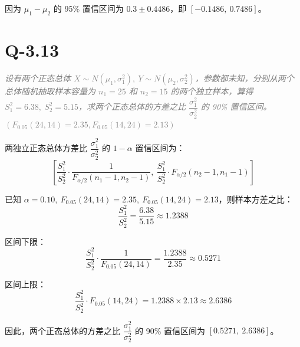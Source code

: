 \documentclass{article}
\begin{document}
因为 $\mu_1-\mu_2$ 的 95\% 置信区间为 $0.3\pm0.4486$，即 $[-0.1486,\ 0.7486]$。



\section{Q-3.13}
\textit{\textcolor{gray}{设有两个正态总体 $X\sim N(\mu_1, \sigma_1^2),\ Y\sim N(\mu_2, \sigma_2^2)$，参数都未知，分别从两个总体随机抽取样本容量为 $n_1=25$ 和 $n_2=15$ 的两个独立样本，算得 $S_1^2=6.38,\ S_2^2=5.15$，求两个正态总体的方差之比 $\dfrac{\sigma_1^2}{\sigma_2^2}$ 的 90\% 置信区间。$(F_{0.05}(24,14) = 2.35, F_{0.05}(14,24) = 2.13)$}}

两独立正态总体方差比 $\dfrac{\sigma_1^2}{\sigma_2^2}$ 的 $1-\alpha$ 置信区间为：
\[ \left[\dfrac{S_1^2}{S_2^2}\cdot\dfrac{1}{F_{\alpha/2}(n_1-1,n_2-1)},\ \dfrac{S_1^2}{S_2^2}\cdot F_{\alpha/2}(n_2-1,n_1-1)\right] \]

已知 $\alpha=0.10,\ F_{0.05}(24,14)=2.35,\ F_{0.05}(14,24)=2.13$，则样本方差之比：
\[ \dfrac{S_1^2}{S_2^2}=\dfrac{6.38}{5.15}\approx1.2388 \]

区间下限：
\[ \dfrac{S_1^2}{S_2^2}\cdot\dfrac{1}{F_{0.05}(24,14)}=\dfrac{1.2388}{2.35}\approx0.5271 \]

区间上限：
\[ \dfrac{S_1^2}{S_2^2}\cdot F_{0.05}(14,24)=1.2388\times2.13\approx2.6386 \]

因此，两个正态总体的方差之比 $\dfrac{\sigma_1^2}{\sigma_2^2}$ 的 90\% 置信区间为 $[0.5271,\ 2.6386]$。
\end{document}

